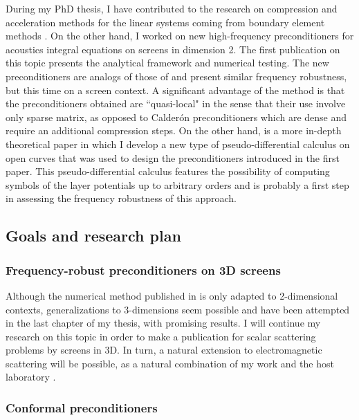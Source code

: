\documentclass[]{article}
\begin{document}
During my PhD thesis, I have contributed to the research on compression and acceleration methods for the linear systems coming from boundary element methods \cite{averseng2017fast}. 
On the other hand, I worked on new high-frequency preconditioners for acoustics integral equations on screens in dimension 2. The first publication on this topic \cite{alouges2019new} presents the analytical framework and numerical testing. The new preconditioners are analogs of those of \cite{antoine2007generalized} and present similar frequency robustness, but this time on a screen context. A significant advantage of the method is that the preconditioners obtained are ``quasi-local" in the sense that their use involve only sparse matrix, as opposed to Calder\'{o}n preconditioners which are dense and require an additional compression steps. On the other hand, \cite{averseng2019pseudo} is a more in-depth theoretical paper in which I develop a new type of pseudo-differential calculus on open curves that was used to design the preconditioners introduced in the first paper. This pseudo-differential calculus features the possibility of computing symbols of the layer potentials up to arbitrary orders and is probably a first step in assessing the frequency robustness of this approach. 



\subsection*{Goals and research plan}


\subsubsection*{Frequency-robust preconditioners on 3D screens}

Although the numerical method published in \cite{alouges2019new} is only adapted to 2-dimensional contexts, generalizations to 3-dimensions seem possible and have been attempted in the last chapter of my thesis, with promising results. I will continue my research on this topic in order to make a publication for scalar scattering problems by screens in 3D. In turn, a natural extension to electromagnetic scattering will be possible, as a natural combination of my work and the host laboratory \cite{hiptmair2019preconditioning}. 

\subsubsection*{Conformal preconditioners}
\end{document}
